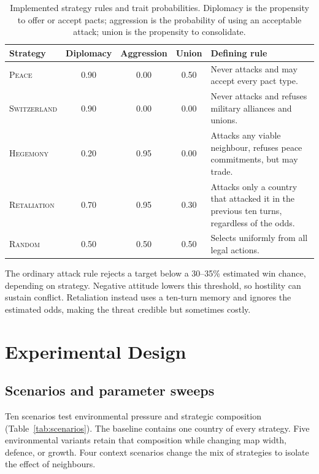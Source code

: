 \documentclass[10pt,twocolumn]{article}
\newcommand{\strategy}[1]{\textsc{#1}}
\begin{document}
\begin{table}[t]
\centering
\caption{Implemented strategy rules and trait probabilities.  Diplomacy is
the propensity to offer or accept pacts; aggression is the probability of
using an acceptable attack; union is the propensity to consolidate.}
\label{tab:strategies}
\begin{tabularx}{\textwidth}{lcccY}
\toprule
Strategy & Diplomacy & Aggression & Union & Defining rule \\
\midrule
\strategy{Peace}       & 0.90 & 0.00 & 0.50 & Never attacks and may accept every pact type. \\
\strategy{Switzerland} & 0.90 & 0.00 & 0.00 & Never attacks and refuses military alliances and unions. \\
\strategy{Hegemony}    & 0.20 & 0.95 & 0.00 & Attacks any viable neighbour, refuses peace commitments, but may trade. \\
\strategy{Retaliation} & 0.70 & 0.95 & 0.30 & Attacks only a country that attacked it in the previous ten turns, regardless of the odds. \\
\strategy{Random}      & 0.50 & 0.50 & 0.50 & Selects uniformly from all legal actions. \\
\bottomrule
\end{tabularx}
\end{table}

The ordinary attack rule rejects a target below a 30--35\% estimated win
chance, depending on strategy.  Negative attitude lowers this threshold, so
hostility can sustain conflict.  Retaliation instead uses a ten-turn memory
and ignores the estimated odds, making the threat credible but sometimes
costly.

\section{Experimental Design}

\subsection{Scenarios and parameter sweeps}

Ten scenarios test environmental pressure and strategic composition
(Table~\ref{tab:scenarios}).  The baseline contains one country of every
strategy.  Five environmental variants retain that composition while
changing map width, defence, or growth.  Four context scenarios change the
mix of strategies to isolate the effect of neighbours.
\end{document}
